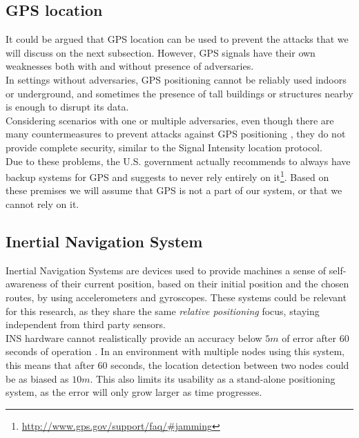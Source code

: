 \documentclass{article}
\begin{document}
\subsection{GPS location}

It could be argued that GPS location can be used to prevent the attacks that we will discuss on the next subsection. However, GPS signals have their own weaknesses both with and without presence of adversaries.\\

In settings without adversaries, GPS positioning cannot be reliably used indoors or underground, and sometimes the presence of tall buildings or structures nearby is enough to disrupt its data.\\

Considering scenarios with one or multiple adversaries, even though there are many countermeasures to prevent attacks against GPS positioning \cite{warner2003gps, wen2005countermeasures, jafarnia2012gps}, they do not provide complete security, similar to the Signal Intensity location protocol.\\

Due to these problems, the U.S. government actually recommends to always have backup systems for GPS and suggests to never rely entirely on it\footnote{\url{http://www.gps.gov/support/faq/#jamming}}. Based on these premises we will assume that GPS is not a part of our system, or that we cannot rely on it.\\

\subsection{Inertial Navigation System}

Inertial Navigation Systems are devices used to provide machines a sense of self-awareness of their current position, based on their initial position and the chosen routes, by using accelerometers and gyroscopes. These systems could be relevant for this research, as they share the same \emph{relative positioning} focus, staying independent from third party sensors.\\

INS hardware cannot realistically provide an accuracy below $5m$ of error after $60$ seconds of operation \cite{woodman2007introduction}. In an environment with multiple nodes using this system, this means that after $60$ seconds, the location detection between two nodes could be as biased as $10m$. This also limits its usability as a stand-alone positioning system, as the error will only grow larger as time progresses.\\
\end{document}
